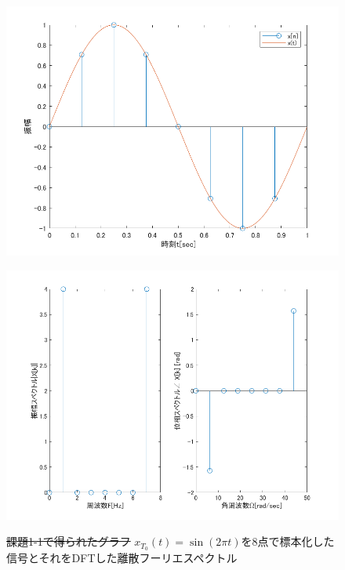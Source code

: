 \documentclass[11pt, a4paper, titlepage]{ltjsarticle}
\begin{document}
\begin{figure}[h]
\begin{center}
\begin{minipage}[t]{0.48\columnwidth}
    \includegraphics[width=\columnwidth]{figures/sampling1-1.png}
    \label{fign:sa1-1}
\end{minipage}
\begin{minipage}[t]{0.48\columnwidth}
    \includegraphics[width=\columnwidth]{figures/spectrum1-1.png}
    \label{fign:sp1-1}
\end{minipage}
\end{center}
\caption{\sout{課題1-1で得られたグラフ}
$x_{T_{0}}(t)=\sin(2\pi t)$を8点で標本化した信号とそれをDFTした離散フーリエスペクトル}
\end{figure}
\end{document}
